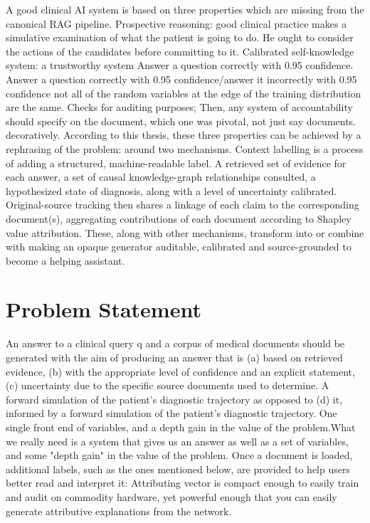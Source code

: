 A good clinical AI system is based on three properties which are missing
from the canonical RAG pipeline. Prospective reasoning: good clinical
practice makes a simulative examination of what the patient is going to
do. He ought to consider the actions of the candidates before committing
to it. Calibrated self-knowledge system: a trustworthy system Answer a
question correctly with 0.95 confidence. Answer a question correctly
with 0.95 confidence/answer it incorrectly with 0.95 confidence not all
of the random variables at the edge of the training distribution are the
same. Checks for auditing purposes; Then, any system of accountability
should specify on the document, which one was pivotal, not just say
documents. decoratively. According to this thesis, these three
properties can be achieved by a rephrasing of the problem: around two
mechanisms. Context labelling is a process of adding a structured,
machine-readable label. A retrieved set of evidence for each answer, a
set of causal knowledge-graph relationships consulted, a hypothesized
state of diagnosis, along with a level of uncertainty calibrated.
Original-source tracking then shares a linkage of each claim to the
corresponding document(s), aggregating contributions of each document
according to Shapley value attribution. These, along with other
mechanisms, transform into or combine with making an opaque generator
auditable, calibrated and source-grounded to become a helping assistant.

\section{Problem Statement}\label{problem-statement}

An answer to a clinical query q and a corpus of medical documents should
be generated with the aim of producing an answer that is (a) based on
retrieved evidence, (b) with the appropriate level of confidence and an
explicit statement,(c) uncertainty due to the specific source documents
used to determine. A forward simulation of the patient's diagnostic
trajectory as opposed to (d) it, informed by a forward simulation of the
patient's diagnostic trajectory. One single front end of variables, and
a depth gain in the value of the problem.What we really need is a system
that gives us an answer as well as a set of variables, and some "depth
gain" in the value of the problem. Once a document is loaded, additional
labels, such as the ones mentioned below, are provided to help users
better read and interpret it: Attributing vector is compact enough to
easily train and audit on commodity hardware, yet powerful enough that
you can easily generate attributive explanations from the network.

